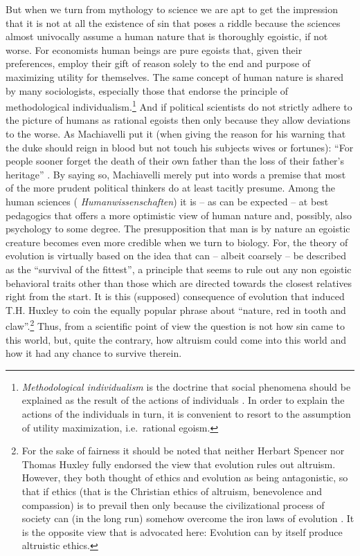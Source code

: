 But when we turn from mythology to science we are apt to get the impression
that it is not at all the existence of sin that poses a riddle because the
sciences almost univocally assume a human nature that is thoroughly egoistic,
if not worse. For economists human beings are pure egoists that, given their
preferences, employ their gift of reason solely to the end and purpose of
maximizing utility for themselves.  The same concept of human nature is shared
by many sociologists, especially those that endorse the principle of
methodological individualism.\footnote{{\em Methodological individualism} is
  the doctrine that social phenomena should be explained as the result of the
  actions of individuals \cite[]{heath:2005}. In order to explain the actions
  of the individuals in turn, it is convenient to resort to the assumption of
  utility maximization, i.e.\ rational egoism.}  And if political scientists
do not strictly adhere to the picture of humans as rational egoists then only
because they allow deviations to the worse.  As Machiavelli put it (when
giving the reason for his warning that the duke should reign in blood but not
touch his subjects wives or fortunes): ``For people sooner forget the death of
their own father than the loss of their father's heritage'' \cite[p.\ 69 (my
translation from German, E.A.)]{machiavelli:1532}.  By saying so, Machiavelli
merely put into words a premise that most of the more prudent political
thinkers do at least tacitly presume. Among the human sciences ({\em
  Humanwissenschaften}) it is -- as can be expected -- at best pedagogics that
offers a more optimistic view of human nature and, possibly, also psychology
to some degree. The presupposition that man is by nature an egoistic creature
becomes even more credible when we turn to biology.  For, the theory of
evolution is virtually based on the idea that can -- albeit coarsely -- be
described as the ``survival of the fittest'', a principle that seems to rule
out any non egoistic behavioral traits other than those which are directed
towards the closest relatives right from the start. It is this (supposed)
consequence of evolution that induced T.H. Huxley to coin the equally popular
phrase about ``nature, red in tooth and claw''.\footnote{For the sake of
  fairness it should be noted that neither Herbart Spencer nor Thomas Huxley
  fully endorsed the view that evolution rules out altruism.  However, they
  both thought of ethics and evolution as being antagonistic, so that if
  ethics (that is the Christian ethics of altruism, benevolence and
  compassion) is to prevail then only because the civilizational process of
  society can (in the long run) somehow overcome the iron laws of evolution
  \cite[]{spencer:1907, huxley:1893}. It is the opposite view that is
  advocated here: Evolution can by itself produce altruistic ethics.}  Thus,
from a scientific point of view the question is not how sin came to this
world, but, quite the contrary, how altruism could come into this world and
how it had any chance to survive therein.

